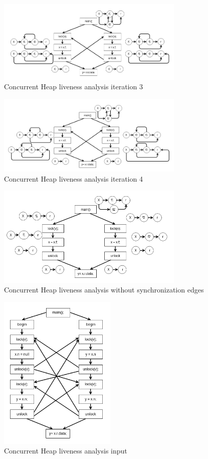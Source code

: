 \begin{figure}
	\centering
	\includegraphics[width=0.8\textwidth]{Figures/conc_analysis_itr3.png}
	\caption{Concurrent Heap liveness analysis iteration 3}
	\label{fig:nullpointeranalysis}
\end{figure}

\begin{figure}
	\centering
	\includegraphics[width=0.8\textwidth]{Figures/conc_analysis_itr4.png}
	\caption{Concurrent Heap liveness analysis iteration 4}
	\label{fig:nullpointeranalysis}
\end{figure}

\begin{figure}
	\centering
	\includegraphics[width=0.8\textwidth]{Figures/conc_analysis_incorrect.png}
	\caption{Concurrent Heap liveness analysis without synchronization edges}
	\label{fig:nullpointeranalysis}
\end{figure}

\begin{figure}
	\centering
	\includegraphics[width=0.5\textwidth]{Figures/hra_live_concurrent.png}
	\caption{Concurrent Heap liveness analysis input}
	\label{fig:nullpointeranalysis}
\end{figure}     

